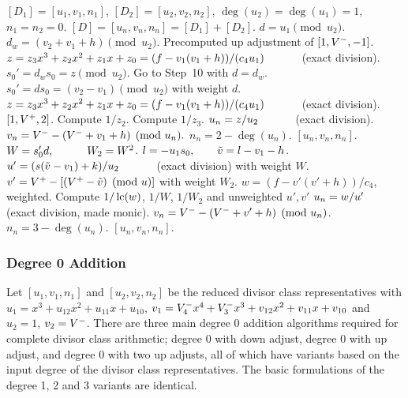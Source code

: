 \begin{algorithm}[H]
\caption{Genus 3 Split Model Degree 1 Addition with Two Up Adjusts\label{alg:g3explSPLIT1ADDUP2}}
\begin{algorithmic} [1]
\Require $[D_1] = [u_1,v_1,n_1]$, $[D_2] = [u_2,v_2,n_2]$, $\deg(u_2) = \deg(u_1) = 1$, $n_1 = n_2 = 0$.
\Ensure $[D] = [u_n,v_n,n_n] = [D_1] + [D_2] $.
\algrule
\vspace{-2pt}
\State $d = u_1 \pmod{u_2}$.
    \State $d_w = (v_2 + v_1 + h) \pmod{u_2}$.
     \Return Precomputed up adjustment of $[1,V^{-},-1]$.
    \EndIf
    \State $z = z_3x^3 + z_2x^2 + z_1x + z_0 = (f - v_1(v_1 + h))/(c_4u_1) \quad\quad\quad$ (exact division).  
    \State $s_0' = d_ws_0 = z \pmod{u_2}$.
    \State Go to Step~10 with $d = d_w$.
\EndIf
\State $s_0' = ds_0 = (v_2 - v_1) \pmod{u_2}$ with weight $d$.
\State $z = z_3x^3 + z_2x^2 + z_1x + z_0 = (f - v_1(v_1 + h))/(c_4u_1) \quad\quad\quad$ (exact division).  
         \Return $[1,V^{+},2]$.
        \Else \hspace{3pt} Compute $1/z_2$.
        \EndIf
    \Else \hspace{3pt} Compute $1/z_3$.
    \EndIf
    \State $u_n = z/u_2 \quad\quad\quad$ (exact division).
    \State $v_n = V^{-} - (V^{-} + v_1 + h) \pmod{u_n}.$
    \State $n_n = 2 - \deg(u_n)$.
    \State \Return $[u_n,v_n,n_n]$.
\EndIf
\State $W = s_0'd, \quad\quad\quad W_2 = W^2$.
\State $l = -u_1s_0, \quad\quad \tilde{v} = l - v_1 - h$.
\State $u' = (s(\tilde{v} - v_1) + k)/u_2 \quad\quad\quad$ (exact division) with weight $W$.
\State $v' = V^{+} - [(V^{+} - \tilde{v}) \pmod{u}]$  with weight $W_2$.
\State $w = (f - v'(v' + h))/c_4$, weighted.
\State Compute $1/\operatorname{lc}(w)$, $1/W$, $1/W_2$ and unweighted $u',v'$
\State $u_n = w/u' \quad\quad\quad$ (exact division, made monic).
\State $v_n = V^{-} - (V^{-} + v' + h) \pmod{u_n}$.
\State $n_n = 3 - \deg(u_n)$.
\State \Return $[u_n,v_n,n_n]$.
\vspace{-2pt}
\end{algorithmic}
\end{algorithm}



\subsubsection{Degree 0 Addition}
Let $[u_1,v_1,n_1]$ and $[u_2,v_2,n_2]$ be the reduced divisor class representatives
with $u_1 = x^3 + u_{12}x^2 + u_{11}x + u_{10}$, $v_1 = V^{-}_4x^4 + V^{-}_3x^3 +
v_{12}x^2 + v_{11}x + v_{10}$ and $u_2 = 1$, $v_2 = V^{-}$. There are three main
degree 0 addition algorithms required for complete divisor class arithmetic;
degree 0 with down adjust, degree 0 with up adjust, and degree 0 with two up
adjusts, all of which have variants based on the input degree of the divisor
class representatives. The basic formulations of the degree 1, 2 and 3 variants
are identical. 

